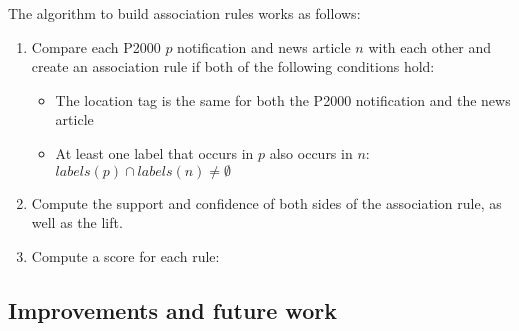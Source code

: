 The algorithm to build association rules works as follows:
\begin{enumerate}
\item Compare each P2000 $p$ notification and news article $n$ with each other and create an association rule if both of the following conditions hold: 
	\begin{itemize}[noitemsep]
	\item The location tag is the same for both the P2000 notification and the news article
	\item At least one label that occurs in $p$ also occurs in $n$: $labels(p) \cap labels(n) \not= \emptyset$
	\end{itemize}
\item Compute the support and confidence of both sides of the association rule, as well as the lift.
\item Compute a score for each rule:
\end{enumerate}


\subsection{Improvements and future work}